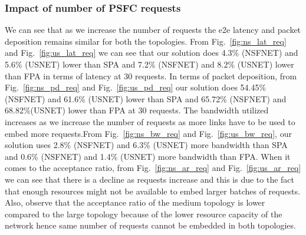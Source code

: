 \documentclass[journal]{IEEEtran}
\begin{document}
\subsubsection{Impact of number of PSFC requests}
We can see that as we increase the number of requests the e2e latency and packet deposition remains similar for both the topologies. From Fig.~\ref{fig:ns_lat_req} and Fig.~\ref{fig:us_lat_req} we can see that our solution does 4.3\% (NSFNET) and 5.6\% (USNET) lower than SPA and 7.2\% (NSFNET) and 8.2\% (USNET) lower than FPA in terms of latency at 30 requests. In terms of packet deposition, from Fig.~\ref{fig:ns_pd_req} and Fig.~\ref{fig:us_pd_req} our solution does 54.45\% (NSFNET) and 61.6\% (USNET) lower than SPA and 65.72\% (NSFNET) and 68.82\%(USNET) lower than FPA at 30 requests. The bandwidth utilized increases as we increase the number of requests as more links have to be used to embed more requests.From Fig.~\ref{fig:ns_bw_req} and Fig.~\ref{fig:us_bw_req}, our solution uses 2.8\% (NSFNET) and 6.3\% (USNET) more bandwidth than SPA and 0.6\% (NSFNET) and 1.4\% (USNET) more bandwidth than FPA. When it comes to the acceptance ratio, from Fig.~\ref{fig:ns_ar_req} and Fig.~\ref{fig:us_ar_req} we can see that there is a decline as requests increase and this is due to the fact that enough resources might not be available to embed larger batches of requests. Also, observe that the acceptance ratio of the medium topology is lower compared to the large topology because of the lower resource capacity of the network hence same number of requests cannot be embedded in both topologies.
\end{document}
